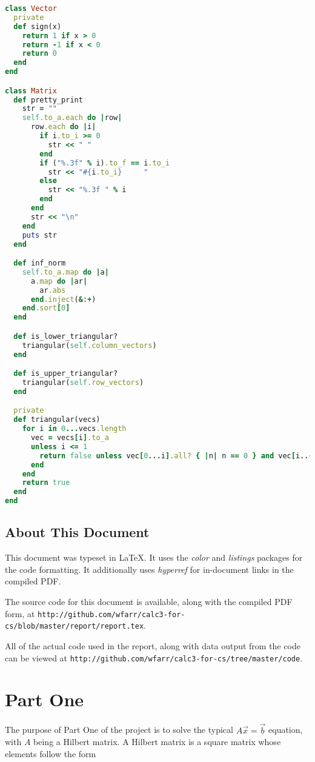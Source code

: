 \documentclass[letterpaper,12pt]{article}
\begin{document}
\lstset{caption=Common Code for All Three Parts}
\begin{lstlisting}[language=ruby]
class Vector
  private
  def sign(x)
    return 1 if x > 0
    return -1 if x < 0
    return 0
  end
end

class Matrix
  def pretty_print
    str = ""
    self.to_a.each do |row|
      row.each do |i|
        if i.to_i >= 0
          str << " "
        end
        if ("%.3f" % i).to_f == i.to_i
          str << "#{i.to_i}     "
        else
          str << "%.3f " % i
        end
      end
      str << "\n"
    end
    puts str
  end

  def inf_norm
    self.to_a.map do |a|
      a.map do |ar|
        ar.abs
      end.inject(&:+)
    end.sort[0]
  end

  def is_lower_triangular?
    triangular(self.column_vectors)
  end

  def is_upper_triangular?
    triangular(self.row_vectors)
  end

  private
  def triangular(vecs)
    for i in 0...vecs.length
      vec = vecs[i].to_a
      unless i <= 1
        return false unless vec[0...i].all? { |n| n == 0 } and vec[i..-1].all? { |n| n != 0 }
      end
    end
    return true
  end
end
\end{lstlisting}

\subsection{About This Document}

This document was typeset in \LaTeX.
It uses the \textit{color} and \textit{listings} packages for the code
formatting.
It additionally uses \textit{hyperref} for in-document links in the compiled PDF.

The source code for this document is available, along with the compiled PDF form, at
\texttt{http://github.com/wfarr/calc3-for-cs/blob/master/report/report.tex}.

All of the actual code used in the report, along with data output from the code
can be viewed at \texttt{http://github.com/wfarr/calc3-for-cs/tree/master/code}.

\newpage
\section{Part One}


The purpose of Part One of the project is to solve the typical
$A\vec{x} = \vec{b}$ equation, with $A$ being a Hilbert matrix.
A Hilbert matrix is a square matrix whose elements follow the form
\end{document}
